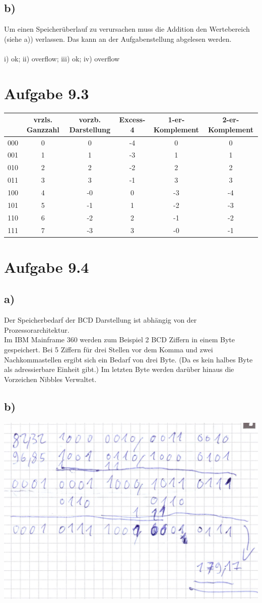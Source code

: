 \documentclass{article}
\begin{document}
	\subsection*{b)}
	Um einen Speicherüberlauf zu verursachen muss die Addition den Wertebereich (siehe a)) verlassen. Das kann an der Aufgabenstellung abgelesen werden. \\
	\\
	i) ok; ii) overflow; iii) ok; iv) overflow
	\section*{Aufgabe 9.3}
	\begin{tabular}[h]{c|c|c|c|c|c}
		& vrzls. Ganzzahl & vorzb. Darstellung & Excess-4 & 1-er-Komplement & 2-er-Komplement \\
		\hline
		000 & 0 & 0 & -4& 0 & 0\\
		001 & 1 & 1 & -3& 1 & 1\\
		010 & 2 & 2 & -2& 2 & 2\\
		011 & 3 & 3 & -1& 3 & 3\\
		100 & 4 & -0 & 0& -3 & -4\\
		101 & 5 & -1 & 1& -2 & -3\\
		110 & 6 & -2 & 2& -1 & -2\\
		111 & 7 & -3 & 3& -0 & -1
	\end{tabular}
	

	\section*{Aufgabe 9.4}
	\subsection*{a)}
	Der Speicherbedarf der BCD Darstellung ist abhängig von der Prozessorarchitektur. \\
	Im IBM Mainframe 360 werden zum Beispiel 2 BCD Ziffern in einem Byte gespeichert. Bei 5 Ziffern für drei Stellen vor dem Komma und zwei Nachkommastellen ergibt sich ein Bedarf von drei Byte. (Da es kein halbes Byte als adressierbare Einheit gibt.) Im letzten Byte werden darüber hinaus die Vorzeichen Nibbles Verwaltet.
	\subsection*{b)}
	\includegraphics{"94b"}
\end{document}
